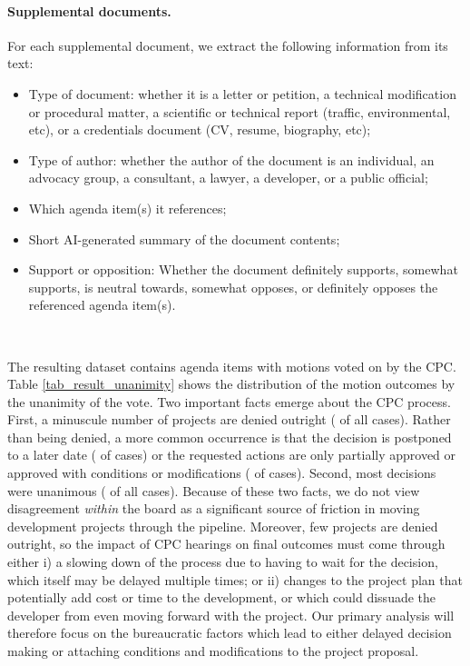 \paragraph{Supplemental documents.} For each supplemental document, we extract the following information from its text:
\begin{itemize}[noitemsep, topsep=0pt]
\item Type of document: whether it is a letter or petition, a technical modification or procedural matter, a scientific or technical report (traffic, environmental, etc), or a credentials document (CV, resume, biography, etc); 
\item Type of author: whether the author of the document is an individual, an advocacy group, a consultant, a lawyer, a developer, or a public official;
\item Which agenda item(s) it references;
\item Short AI-generated summary of the document contents;
\item Support or opposition: Whether the document definitely supports, somewhat supports, is neutral towards, somewhat opposes, or definitely opposes the referenced agenda item(s).
\end{itemize}

~

\noindent The resulting dataset contains  agenda items with motions voted on by the CPC. Table \ref{tab_result_unanimity} shows the distribution of the motion outcomes by the unanimity of the vote. Two important facts emerge about the CPC process. First, a minuscule number of projects are denied outright ( of all cases). Rather than being denied, a more common occurrence is that the decision is postponed to a later date ( of cases) or the requested actions are only partially approved or approved with conditions or modifications ( of cases). Second, most decisions were unanimous ( of all cases). Because of these two facts, we do not view disagreement \emph{within} the board as a significant source of friction in moving development projects through the pipeline. Moreover, few projects are denied outright, so the impact of CPC hearings on final outcomes must come through either i) a slowing down of the process due to having to wait for the decision, which itself may be delayed multiple times; or ii) changes to the project plan that potentially add cost or time to the development, or which could  dissuade the developer from even moving forward with the project. Our primary analysis will therefore focus on the bureaucratic factors which lead to either delayed decision making or attaching conditions and modifications to the project proposal.


